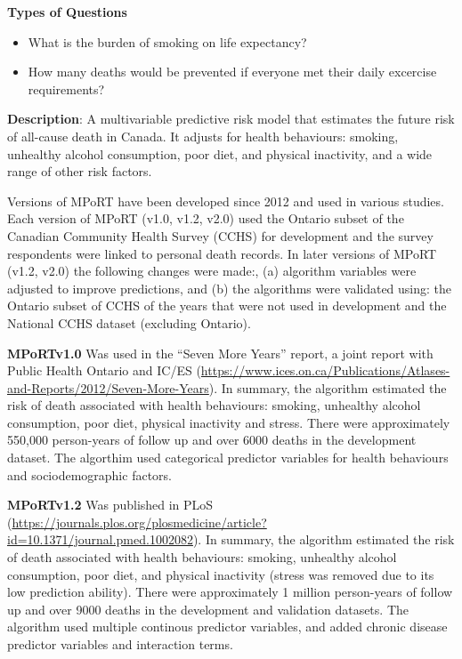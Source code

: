 \documentclass[]{book}
\providecommand{\tightlist}{%
  \setlength{\itemsep}{0pt}\setlength{\parskip}{0pt}}
\begin{document}
\textbf{Types of Questions}

\begin{itemize}
\tightlist
\item
  What is the burden of smoking on life expectancy?
\item
  How many deaths would be prevented if everyone met their daily
  excercise requirements?
\end{itemize}

\textbf{Description}: A multivariable predictive risk model that
estimates the future risk of all-cause death in Canada. It adjusts for
health behaviours: smoking, unhealthy alcohol consumption, poor diet,
and physical inactivity, and a wide range of other risk factors.

Versions of MPoRT have been developed since 2012 and used in various
studies. Each version of MPoRT (v1.0, v1.2, v2.0) used the Ontario
subset of the Canadian Community Health Survey (CCHS) for development
and the survey respondents were linked to personal death records. In
later versions of MPoRT (v1.2, v2.0) the following changes were made:,
(a) algorithm variables were adjusted to improve predictions, and (b)
the algorithms were validated using: the Ontario subset of CCHS of the
years that were not used in development and the National CCHS dataset
(excluding Ontario).

\textbf{MPoRTv1.0} Was used in the ``Seven More Years'' report, a joint
report with Public Health Ontario and IC/ES
(\url{https://www.ices.on.ca/Publications/Atlases-and-Reports/2012/Seven-More-Years}).
In summary, the algorithm estimated the risk of death associated with
health behaviours: smoking, unhealthy alcohol consumption, poor diet,
physical inactivity and stress. There were approximately 550,000
person-years of follow up and over 6000 deaths in the development
dataset. The algorthim used categorical predictor variables for health
behaviours and sociodemographic factors.

\textbf{MPoRTv1.2} Was published in PLoS
(\url{https://journals.plos.org/plosmedicine/article?id=10.1371/journal.pmed.1002082}).
In summary, the algorithm estimated the risk of death associated with
health behaviours: smoking, unhealthy alcohol consumption, poor diet,
and physical inactivity (stress was removed due to its low prediction
ability). There were approximately 1 million person-years of follow up
and over 9000 deaths in the development and validation datasets. The
algorithm used multiple continous predictor variables, and added chronic
disease predictor variables and interaction terms.
\end{document}
